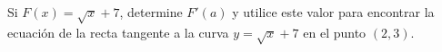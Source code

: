 \item Si $F(x) = \sqrt{x} + 7$, determine $F'(a)$ y utilice este valor para encontrar la ecuación de la recta tangente a la curva $y = \sqrt{x} + 7$ en el punto $(2,3)$.
